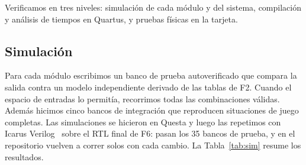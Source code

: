 \documentclass[conference,a4paper]{IEEEtran}
\begin{document}
Verificamos en tres niveles: simulación de cada módulo y del sistema, compilación y análisis de tiempos en Quartus, y pruebas físicas en la tarjeta.

\subsection{Simulación}

Para cada módulo escribimos un banco de prueba autoverificado que compara la salida contra un modelo independiente derivado de las tablas de F2. Cuando el espacio de entradas lo permitía, recorrimos todas las combinaciones válidas. Además hicimos cinco bancos de integración que reproducen situaciones de juego completas. Las simulaciones se hicieron en Questa y luego las repetimos con Icarus Verilog~\cite{icarus} sobre el RTL final de F6: pasan los 35 bancos de prueba, y en el repositorio vuelven a correr solos con cada cambio. La Tabla~\ref{tab:sim} resume los resultados.
\end{document}
